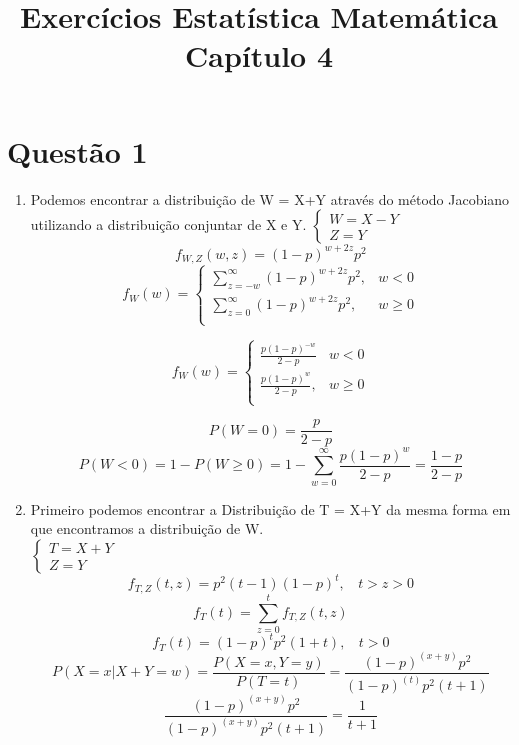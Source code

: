 \documentclass[a4paper,12pt]{report}
\author{}
\title{Exercícios Estatística Matemática\\
Capítulo 4
}
\date{}
\begin{document}
	\maketitle
	\tableofcontents	
	\newpage
\section{Questão 1}
\begin{enumerate}[label=\alph*)]
	\item Podemos encontrar a distribuição de W = X+Y através do método Jacobiano utilizando a distribuição conjuntar de X e Y.
	$\begin{cases}
	W = X-Y\\
	Z = Y
	\end{cases} $
	$$f_{W,Z}(w,z) = (1-p)^{w+2z}p^2 $$
	$$f_W(w) = \begin{cases}
	\sum\limits_{z=-w}^\infty  (1-p)^{w+2z}p^2, & w < 0\\
		\sum\limits_{z=0}^\infty  (1-p)^{w+2z}p^2, & w \ge 0\\
	\end{cases} $$
	
		$$f_W(w) = \begin{cases}
	\frac{p (1-p)^{-w}}{2-p} & w < 0\\
\frac{p (1-p)^w}{2-p}, & w \ge 0\\
	\end{cases} $$
	
	$$P(W=0) =  \frac{p}{2-p}$$
	$$P(W<0) = 1-P(W \ge 0 )= 1 - \sum\limits_{w=0}^{\infty} \frac{p (1-p)^w}{2-p} = \frac{1-p}{2-p} $$
	
	\item Primeiro podemos encontrar a Distribuição de T = X+Y da mesma forma em que encontramos a distribuição de W.\\
		$\begin{cases}
	T = X+Y\\
	Z = Y
	\end{cases} $
		$$f_{T,Z}(t,z) = p^2 (t-1) (1-p)^t, \  \ \ \ t>z>0 $$
		$$f_T(t) = \sum\limits_{z=0}^t f_{T,Z}(t,z)  $$
		$$f_T(t) =(1 - p)^t p^2 (1 + t), \ \ \ \  t>0 $$
	$$P(X=x|X+Y=w)  = \frac{P(X=x,Y=y)}{P(T=t)}
	= \frac{(1-p)^{(x+y)} p^2}{(1-p)^{(t)} p^2 (t+1)}
	$$
	$$
  \frac{(1-p)^{(x+y)} p^2}{(1-p)^{(x+y)} p^2 (t+1)} = \frac{1}{t+1}
	$$
\end{enumerate}
\newpage 
\end{document}
